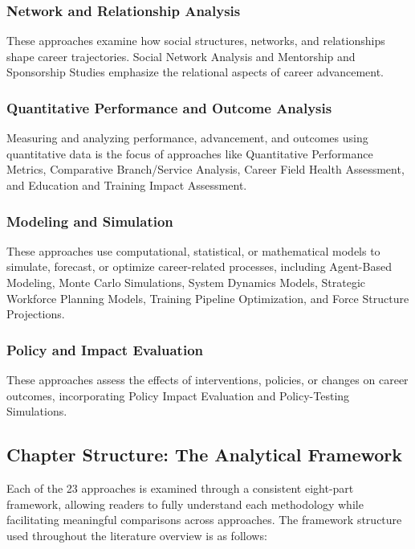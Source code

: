 \documentclass[./main.tex]{subfiles}
\begin{document}
\subsubsection{Network and Relationship
Analysis}\label{network-and-relationship-analysis}

These approaches examine how social structures, networks, and relationships shape career trajectories. Social Network Analysis and Mentorship and Sponsorship Studies emphasize the relational aspects of career advancement.

\subsubsection{Quantitative Performance and Outcome
Analysis}\label{quantitative-performance-and-outcome-analysis}

Measuring and analyzing performance, advancement, and outcomes using quantitative data is the focus of approaches like Quantitative Performance Metrics, Comparative Branch/Service Analysis, Career Field Health Assessment, and Education and Training Impact Assessment.

\subsubsection{Modeling and Simulation}\label{modeling-and-simulation}

These approaches use computational, statistical, or mathematical models to simulate, forecast, or optimize career-related processes, including Agent-Based Modeling, Monte Carlo Simulations, System Dynamics Models, Strategic Workforce Planning Models, Training Pipeline Optimization, and Force Structure Projections.

\subsubsection{Policy and Impact Evaluation}\label{policy-and-impact-evaluation}
These approaches assess the effects of interventions, policies, or changes on career outcomes, incorporating Policy Impact Evaluation and Policy-Testing Simulations.

\subsection{Chapter Structure: The Analytical Framework}\label{chapter-structure-the-analytical framework}
Each of the 23 approaches is examined through a consistent eight-part framework, allowing readers to fully understand each methodology while facilitating meaningful comparisons across approaches. The framework structure used throughout the literature overview is as follows:
\end{document}
